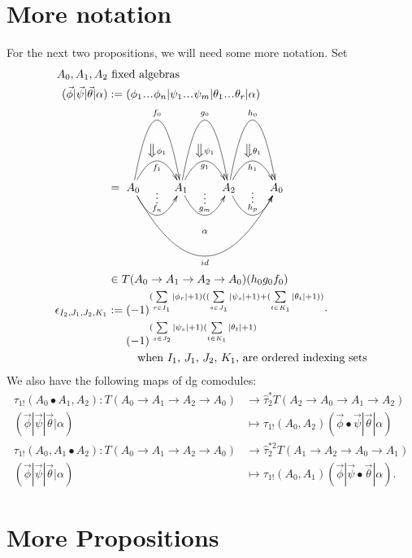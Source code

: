 \section{More notation}
For the next two propositions, we will need 
some more notation. Set
\begin{align*}
A_0, A_1, A_2
&\textrm{ fixed algebras}\\
(\vec{\phi} | \vec{\psi} | \vec{\theta}| \alpha) 
&:= 
(\phi_1\smdots\phi_n | \psi_1\smdots\psi_m| 
  \theta_1 \smdots \theta_r|\alpha)\\
&= 
\xymatrix{
A_0 \ar@/^5pc/[r]^{f_0} 
\ar@/^2pc/[r]^{\big\Downarrow \phi_1}_{f_1} 
\ar@/_2pc/[r]^{\substack{\vdots\\ f_n}}
\ar@/_5pc/[rrr]_{id}^{\substack{\alpha \\ \\ \\ \\ }}
& A_1 \ar@/^5pc/[r]^{g_0} 
\ar@/^2pc/[r]^{\big\Downarrow \psi_1}_{g_1} 
\ar@/_2pc/[r]^{\substack{\vdots\\ g_m}}
& A_2 \ar@/^5pc/[r]^{h_0} 
\ar@/^2pc/[r]^{\big\Downarrow \theta_1}_{h_1} 
\ar@/_2pc/[r]^{\substack{\vdots\\ h_p}}
& A_0
}\\
&\in 
T(A_0 \to A_1 \to A_2 \to A_0)(h_0g_0f_0)\\
\epsilon_{I_2,J_1,J_2,K_1} 
&:= 
(-1)^{(\sum \limits_{r \in I_1}|\phi_r|+1)
  ((\sum \limits_{s \in J_1}|\psi_s|+1) + 
  (\sum \limits_{t \in K_1}|\theta_t|+1))}\cdot\\
&\phantom{{}:={}} 
  (-1)^{(\sum \limits_{s \in J_2}|\psi_s|+1)
  (\sum \limits_{t \in K_1}|\theta_t|+1)}\\
&\phantom{{}:={}}  
  \quad \textrm{when $I_1$, $J_1$, $J_2$, $K_1$, 
  are ordered indexing sets}
\end{align*}
We also have the following maps of dg comodules:
\begin{align*}
\tau_{1!}(A_0\bullet A_1, A_2):
  T(A_0 \to A_1 \to A_2 \to A_0) 
&\to
\hat{\tau}_2^*T(A_2 \to A_0 \to A_1 \to A_2)\\
(\vec{\phi} | \vec{\psi} | \vec{\theta}| \alpha) 
&\mapsto 
\tau_{1!}(A_0,A_2)
  (\vec{\phi} \bullet \vec{\psi} | \vec{\theta}| \alpha)\\
\tau_{1!}(A_0,A_1\bullet A_2):
  T(A_0 \to A_1 \to A_2 \to A_0) 
&\to
\hat{\tau}_2^{*2}T(A_1 \to A_2 \to A_0 \to A_1)\\
(\vec{\phi} | \vec{\psi} | \vec{\theta}| \alpha) 
&\mapsto 
\tau_{1!}(A_0,A_1)
  (\vec{\phi}|\vec{\psi} \bullet \vec{\theta}| \alpha).
\end{align*}

\section{More Propositions}

